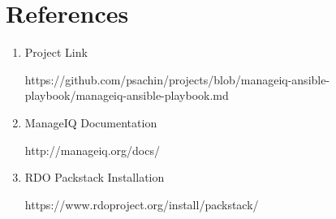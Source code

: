 \documentclass[a4paper,12pt]{report}
\begin{document}
\chapter{References}
\begin{enumerate}
	\item Project Link
	
	https://github.com/psachin/projects/blob/manageiq-ansible-playbook/manageiq-ansible-playbook.md
	
	\item ManageIQ Documentation
	
	http://manageiq.org/docs/
	
	\item RDO Packstack Installation
	
	https://www.rdoproject.org/install/packstack/
	
	
\end{enumerate}
\end{document}
